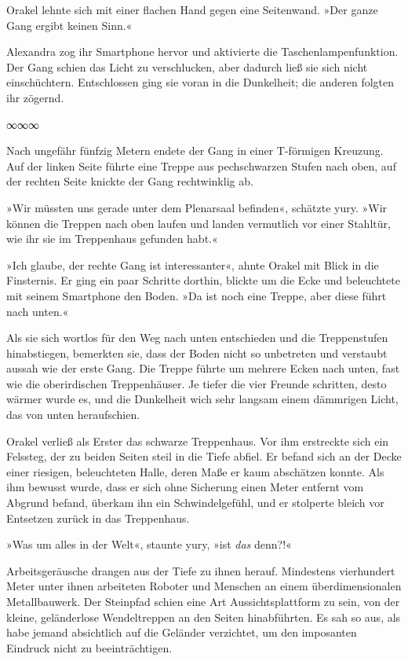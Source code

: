 Orakel lehnte sich mit einer flachen Hand gegen eine Seitenwand. »Der ganze Gang ergibt keinen Sinn.«

Alexandra zog ihr Smartphone hervor und aktivierte die Taschenlampenfunktion. Der Gang schien das Licht zu verschlucken, aber dadurch ließ sie sich nicht einschüchtern. Entschlossen ging sie voran in die Dunkelheit; die anderen folgten ihr zögernd.

\begin{center}
∞∞∞
\end{center}

Nach ungefähr fünfzig Metern endete der Gang in einer T-förmigen Kreuzung. Auf der linken Seite führte eine Treppe aus pechschwarzen Stufen nach oben, auf der rechten Seite knickte der Gang rechtwinklig ab.

»Wir müssten uns gerade unter dem Plenarsaal befinden«, schätzte yury. »Wir können die Treppen nach oben laufen und landen vermutlich vor einer Stahltür, wie ihr sie im Treppenhaus gefunden habt.«

»Ich glaube, der rechte Gang ist interessanter«, ahnte Orakel mit Blick in die Finsternis. Er ging ein paar Schritte dorthin, blickte um die Ecke und beleuchtete mit seinem Smartphone den Boden. »Da ist noch eine Treppe, aber diese führt nach unten.«

Als sie sich wortlos für den Weg nach unten entschieden und die Treppenstufen hinabstiegen, bemerkten sie, dass der Boden nicht so unbetreten und verstaubt aussah wie der erste Gang. Die Treppe führte um mehrere Ecken nach unten, fast wie die oberirdischen Treppenhäuser. Je tiefer die vier Freunde schritten, desto wärmer wurde es, und die Dunkelheit wich sehr langsam einem dämmrigen Licht, das von unten heraufschien.

Orakel verließ als Erster das schwarze Treppenhaus. Vor ihm erstreckte sich ein Felssteg, der zu beiden Seiten steil in die Tiefe abfiel. Er befand sich an der Decke einer riesigen, beleuchteten Halle, deren Maße er kaum abschätzen konnte. Als ihm bewusst wurde, dass er sich ohne Sicherung einen Meter entfernt vom Abgrund befand, überkam ihn ein Schwindelgefühl, und er stolperte bleich vor Entsetzen zurück in das Treppenhaus.

»Was um alles in der Welt«, staunte yury, »ist \emph{das} denn?!«

Arbeitsgeräusche drangen aus der Tiefe zu ihnen herauf. Mindestens vierhundert Meter unter ihnen arbeiteten Roboter und Menschen an einem überdimensionalen Metallbauwerk. Der Steinpfad schien eine Art Aussichtsplattform zu sein, von der kleine, geländerlose Wendeltreppen an den Seiten hinabführten. Es sah so aus, als habe jemand absichtlich auf die Geländer verzichtet, um den imposanten Eindruck nicht zu beeinträchtigen.

